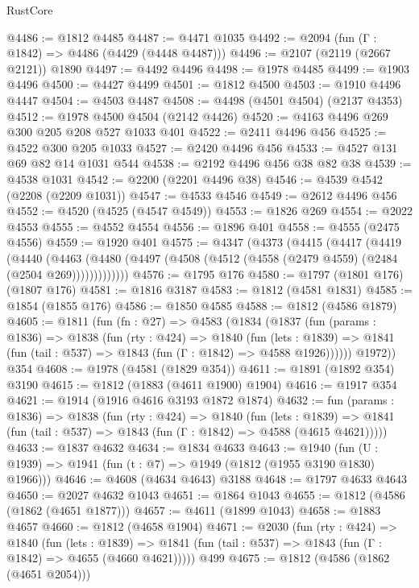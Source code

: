 \begin{lexlean}{RustCore}
\begin{coremodule}
@4486 := @1812 @4485
@4487 := @4471 @1035
@4492 := @2094 (fun (Γ : @1842) => @4486 (@4429 (@4448 @4487)))
@4496 := @2107 (@2119 (@2667 @2121)) @1890
@4497 := @4492 @4496
@4498 := @1978 @4485
@4499 := @1903 @4496
@4500 := @4427 @4499
@4501 := @1812 @4500
@4503 := @1910 @4496 @4447
@4504 := @4503 @4487
@4508 := @4498 (@4501 @4504) (@2137 @4353)
@4512 := @1978 @4500 @4504 (@2142 @4426)
@4520 := @4163 @4496 @269 @300 @205 @208 @527 @1033 @401
@4522 := @2411 @4496 @456
@4525 := @4522 @300 @205 @1033
@4527 := @2420 @4496 @456
@4533 := @4527 @131 @69 @82 @14 @1031 @544
@4538 := @2192 @4496 @456 @38 @82 @38
@4539 := @4538 @1031
@4542 := @2200 (@2201 @4496 @38)
@4546 := @4539 @4542 (@2208 (@2209 @1031))
@4547 := @4533 @4546
@4549 := @2612 @4496 @456
@4552 := @4520 (@4525 (@4547 @4549))
@4553 := @1826 @269
@4554 := @2022 @4553
@4555 := @4552 @4554
@4556 := @1896 @401
@4558 := @4555 (@2475 @4556)
@4559 := @1920 @401
@4575 := @4347
    (@4373
      (@4415
        (@4417
          (@4419
            (@4440
              (@4463
                (@4480 (@4497 (@4508 (@4512 (@4558 (@2479 @4559) (@2484 (@2504 @269)))))))))))))
@4576 := @1795 @176
@4580 := @1797 (@1801 @176) (@1807 @176)
@4581 := @1816 @3187
@4583 := @1812 (@4581 @1831)
@4585 := @1854 (@1855 @176)
@4586 := @1850 @4585
@4588 := @1812 (@4586 @1879)
@4605 := @1811
    (fun (fn : @27) =>
    @4583
      (@1834
        (@1837
          (fun (params : @1836) =>
          @1838
            (fun (rty : @424) =>
            @1840
              (fun (lets : @1839) =>
              @1841 (fun (tail : @537) => @1843 (fun (Γ : @1842) => @4588 @1926))))))
        @1972))
    @354
@4608 := @1978 (@4581 (@1829 @354))
@4611 := @1891 (@1892 @354) @3190
@4615 := @1812 (@1883 (@4611 @1900) @1904)
@4616 := @1917 @354
@4621 := @1914 (@1916 @4616 @3193 @1872 @1874)
@4632 := fun (params : @1836) =>
  @1838
    (fun (rty : @424) =>
    @1840
      (fun (lets : @1839) =>
      @1841 (fun (tail : @537) => @1843 (fun (Γ : @1842) => @4588 (@4615 @4621)))))
@4633 := @1837 @4632
@4634 := @1834 @4633
@4643 := @1940 (fun (U : @1939) => @1941 (fun (t : @7) => @1949 (@1812 (@1955 @3190 @1830) @1966)))
@4646 := @4608 (@4634 @4643) @3188
@4648 := @1797 @4633 @4643
@4650 := @2027 @4632 @1043
@4651 := @1864 @1043
@4655 := @1812 (@4586 (@1862 (@4651 @1877)))
@4657 := @4611 (@1899 @1043)
@4658 := @1883 @4657
@4660 := @1812 (@4658 @1904)
@4671 := @2030
    (fun (rty : @424) =>
    @1840
      (fun (lets : @1839) =>
      @1841 (fun (tail : @537) => @1843 (fun (Γ : @1842) => @4655 (@4660 @4621)))))
    @499
@4675 := @1812 (@4586 (@1862 (@4651 @2054)))

\end{coremodule}
\end{lexlean}
